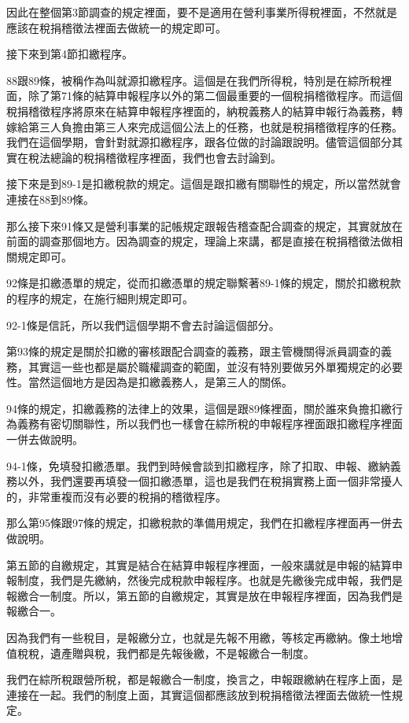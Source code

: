 \documentclass[]{ctexbook}
\begin{document}
因此在整個第3節調查的規定裡面，要不是適用在營利事業所得稅裡面，不然就是應該在稅捐稽徵法裡面去做統一的規定即可。

接下來到第4節扣繳程序。

88跟89條，被稱作為叫就源扣繳程序。這個是在我們所得稅，特別是在綜所稅裡面，除了第71條的結算申報程序以外的第二個最重要的一個稅捐稽徵程序。而這個稅捐稽徵程序將原來在結算申報程序裡面的，納稅義務人的結算申報行為義務，轉嫁給第三人負擔由第三人來完成這個公法上的任務，也就是稅捐稽徵程序的任務。
我們在這個學期，會針對就源扣繳程序，跟各位做的討論跟說明。儘管這個部分其實在稅法總論的稅捐稽徵程序裡面，我們也會去討論到。

接下來是到89-1是扣繳稅款的規定。這個是跟扣繳有關聯性的規定，所以當然就會連接在88到89條。

那么接下來91條又是營利事業的記帳規定跟報告稽查配合調查的規定，其實就放在前面的調查那個地方。因為調查的規定，理論上來講，都是直接在稅捐稽徵法做相關規定即可。

92條是扣繳憑單的規定，從而扣繳憑單的規定聯繫著89-1條的規定，關於扣繳稅款的程序的規定，在施行細則規定即可。

92-1條是信託，所以我們這個學期不會去討論這個部分。

第93條的規定是關於扣繳的審核跟配合調查的義務，跟主管機關得派員調查的義務，其實這一些也都是屬於職權調查的範圍，並沒有特別要做另外單獨規定的必要性。當然這個地方是因為是扣繳義務人，是第三人的關係。

94條的規定，扣繳義務的法律上的效果，這個是跟89條裡面，關於誰來負擔扣繳行為義務有密切關聯性，所以我們也一樣會在綜所稅的申報程序裡面跟扣繳程序裡面一併去做說明。

94-1條，免填發扣繳憑單。我們到時候會談到扣繳程序，除了扣取、申報、繳納義務以外，我們還要再填發一個扣繳憑單，這也是我們在稅捐實務上面一個非常擾人的，非常重複而沒有必要的稅捐的稽徵程序。

那么第95條跟97條的規定，扣繳稅款的準備用規定，我們在扣繳程序裡面再一併去做說明。

第五節的自繳規定，其實是結合在結算申報程序裡面，一般來講就是申報的結算申報制度，我們是先繳納，然後完成稅款申報程序。也就是先繳後完成申報，我們是報繳合一制度。所以，第五節的自繳規定，其實是放在申報程序裡面，因為我們是報繳合一。

因為我們有一些稅目，是報繳分立，也就是先報不用繳，等核定再繳納。像土地增值稅稅，遺產贈與稅，我們都是先報後繳，不是報繳合一制度。

我們在綜所稅跟營所稅，都是報繳合一制度，換言之，申報跟繳納在程序上面，是連接在一起。我們的制度上面，其實這個都應該放到稅捐稽徵法裡面去做統一性規定。
\end{document}
